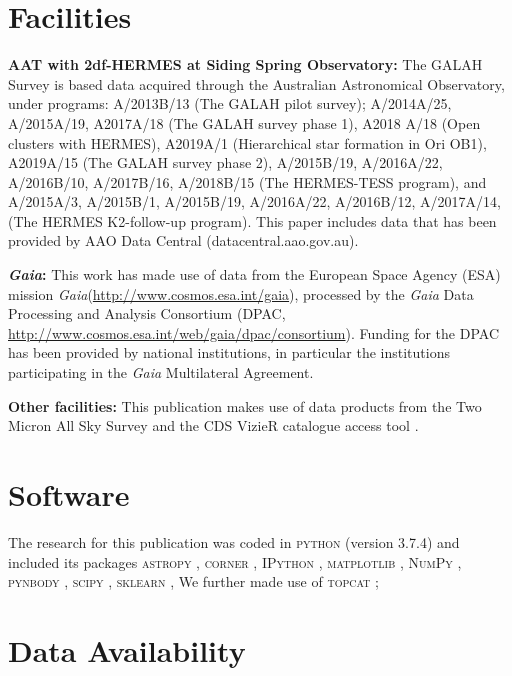 \documentclass[fleqn,usenatbib]{mnras}
\newcommand{\Gaia}{\textit{Gaia}\xspace} %
\begin{document}
\section*{Facilities}

\textbf{AAT with 2df-HERMES at Siding Spring Observatory:}
The GALAH Survey is based data acquired through the Australian Astronomical Observatory, under programs: A/2013B/13 (The GALAH pilot survey); A/2014A/25, A/2015A/19, A2017A/18 (The GALAH survey phase 1), A2018 A/18 (Open clusters with HERMES), A2019A/1 (Hierarchical star formation in Ori OB1), A2019A/15 (The GALAH survey phase 2), A/2015B/19, A/2016A/22, A/2016B/10, A/2017B/16, A/2018B/15 (The HERMES-TESS program), and A/2015A/3, A/2015B/1, A/2015B/19, A/2016A/22, A/2016B/12, A/2017A/14, (The HERMES K2-follow-up program). This paper includes data that has been provided by AAO Data Central (datacentral.aao.gov.au).

\textbf{\Gaia: } This work has made use of data from the European Space Agency (ESA) mission \Gaia (\url{http://www.cosmos.esa.int/gaia}), processed by the \Gaia Data Processing and Analysis Consortium (DPAC, \url{http://www.cosmos.esa.int/web/gaia/dpac/consortium}). Funding for the DPAC has been provided by national institutions, in particular the institutions participating in the \Gaia Multilateral Agreement. 

\textbf{Other facilities:} This publication makes use of data products from the Two Micron All Sky Survey \citep{Skrutskie2006} and the CDS VizieR catalogue access tool \citep{Vizier2000}.

\section*{Software}

The research for this publication was coded in \textsc{python} (version 3.7.4) and included its packages
\textsc{astropy} \citep[v. 3.2.2;][]{Robitaille2013,PriceWhelan2018},
\textsc{corner} \citep[v. 2.0.1;][]{corner},
\textsc{IPython} \citep[v. 7.8.0;][]{ipython},
\textsc{matplotlib} \citep[v. 3.1.3;][]{matplotlib},
\textsc{NumPy} \citep[v. 1.17.2;][]{numpy},
\textsc{pynbody} \citep[v. 1.1.0;][]{pynbody},
\textsc{scipy} \citep[version 1.3.1;][]{scipy},
\textsc{sklearn} \citep[v. 0.21.3;][]{scikit-learn},
We further made use of \textsc{topcat} \citep[version 4.7;][]{Taylor2005};

\section*{Data Availability}
\end{document}
